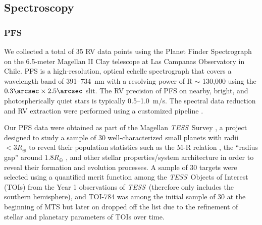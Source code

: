 \documentclass[twocolumn]{aastex631}
\newcommand{\tess}{\textit{TESS}\ }
\begin{document}
\subsection{Spectroscopy}
\label{sec:Spectroscopy}
\subsubsection{PFS} 
\label{sec:PFS}

We collected a total of 35 RV data points using the Planet Finder Spectrograph \citep[PFS;][]{crane2006, crane2008, crane2010} on the 6.5-meter Magellan II Clay telescope at Las Campanas Observatory in Chile. PFS is a high-resolution, optical echelle spectrograph that covers a wavelength band of 391--734~nm with a resolving power of R $\sim$ 130,000 using the $0.3\arcsec\times 2.5\arcsec$ slit. The RV precision of PFS on nearby, bright, and photospherically quiet stars is typically 0.5--1.0~m/s. The spectral data reduction and RV extraction were performed using a customized pipeline \citep{butler1996}.

Our PFS data were obtained as part of the Magellan \tess Survey \citep[MTS;][]{Teske2021}, a project designed to study a sample of 30 well-characterized small planets with radii $< 3R_{\oplus}$ to reveal their population statistics such as the M-R relation \citep{Wolfgang2016, Weiss2018b}, the ``radius gap'' around $1.8R_{\oplus}$ \citep{Fulton2017, Petigura2022}, and other stellar properties/system architecture in order to reveal their formation and evolution processes. A sample of 30 targets were selected using a quantified merit function among the \tess Objects of Interest (TOIs) from the Year 1 observations of \tess (therefore only includes the southern hemisphere), and TOI-784 was among the initial sample of 30 at the beginning of MTS but later on dropped off the list due to the refinement of stellar and planetary parameters of TOIs over time.

\end{document}
